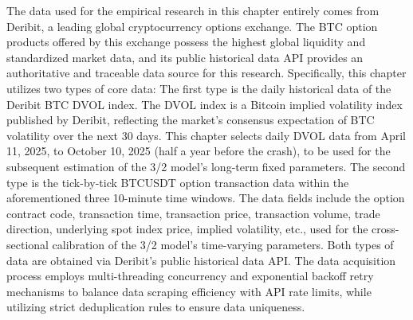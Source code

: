 The data used for the empirical research in this chapter entirely comes from Deribit, a leading global cryptocurrency options exchange. The BTC option products offered by this exchange possess the highest global liquidity and standardized market data, and its public historical data API provides an authoritative and traceable data source for this research. Specifically, this chapter utilizes two types of core data: The first type is the daily historical data of the Deribit BTC DVOL index. The DVOL index is a Bitcoin implied volatility index published by Deribit, reflecting the market's consensus expectation of BTC volatility over the next 30 days. This chapter selects daily DVOL data from April 11, 2025, to October 10, 2025 (half a year before the crash), to be used for the subsequent estimation of the 3/2 model's long-term fixed parameters. The second type is the tick-by-tick BTCUSDT option transaction data within the aforementioned three 10-minute time windows. The data fields include the option contract code, transaction time, transaction price, transaction volume, trade direction, underlying spot index price, implied volatility, etc., used for the cross-sectional calibration of the 3/2 model's time-varying parameters. Both types of data are obtained via Deribit's public historical data API. The data acquisition process employs multi-threading concurrency and exponential backoff retry mechanisms to balance data scraping efficiency with API rate limits, while utilizing strict deduplication rules to ensure data uniqueness.

